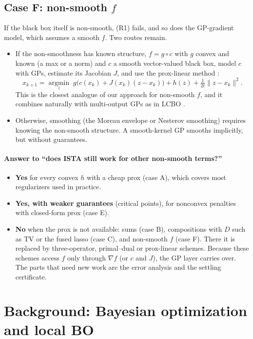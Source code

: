 \documentclass[10pt]{article}
\theoremstyle{remark}
\begin{document}
\subsection{Case F: non-smooth $f$}\label{sec:ext-nonsmooth-f}
If the black box itself is non-smooth, (R1) fails, and so does the GP-gradient model, which assumes a smooth $f$. Two routes remain.
\begin{itemize}
\item If the non-smoothness has known structure, $f=g\circ c$ with $g$ convex and known (a max or a norm) and $c$ a smooth vector-valued black box,
model $c$ with GPs, estimate its Jacobian $J$, and use the prox-linear method \citep{lewis2016proxlinear,drusvyatskiy2019composite}:
\[
x_{k+1}=\operatorname*{argmin}_z\; g\big(c(x_k)+J(x_k)(z-x_k)\big)+h(z)+\tfrac{1}{2t}\|z-x_k\|^2 .
\]
This is the closest analogue of our approach for non-smooth $f$, and it combines naturally with multi-output GPs as in LCBO \citep{jing2026lcbo}.
\item Otherwise, smoothing (the Moreau envelope or Nesterov smoothing) \citep{nesterov2005smooth,beck2012smoothing} requires knowing the
non-smooth structure. A smooth-kernel GP smooths implicitly, but without guarantees.
\end{itemize}

\paragraph{Answer to ``does ISTA still work for other non-smooth terms?''}
\begin{itemize}
\item \textbf{Yes} for every convex $h$ with a cheap prox (case A), which covers most regularizers used in practice.
\item \textbf{Yes, with weaker guarantees} (critical points), for nonconvex penalties with closed-form prox (case E).
\item \textbf{No} when the prox is not available: sums (case B), compositions with $D$ such as TV or the fused lasso (case C), and non-smooth $f$
(case F). There it is replaced by three-operator, primal--dual or prox-linear schemes. Because these schemes access $f$ only through
$\nabla f$ (or $c$ and $J$), the GP layer carries over. The parts that need new work are the error analysis and the settling certificate.
\end{itemize}

\section{Background: Bayesian optimization and local BO}\label{sec:bo}
\end{document}
